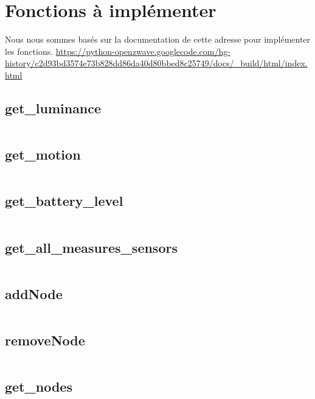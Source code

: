 \section{Fonctions à implémenter}
Nous nous sommes basés sur la documentation de cette adresse pour implémenter les fonctions. \url{https://python-openzwave.googlecode.com/hg-history/c2d93bd3574e73b828dd86da40d80bbed8c25749/docs/_build/html/index.html}
\subsection{get\_luminance}
\begin{lstlisting}

\end{lstlisting}
\subsection{get\_motion}
\begin{lstlisting}

\end{lstlisting}
\subsection{get\_battery\_level}
\begin{lstlisting}

\end{lstlisting}
\subsection{get\_all\_measures\_sensors}
\begin{lstlisting}

\end{lstlisting}
\subsection{addNode}
\begin{lstlisting}

\end{lstlisting}
\subsection{removeNode}
\begin{lstlisting}

\end{lstlisting}
\subsection{get\_nodes}
\begin{lstlisting}

\end{lstlisting}
